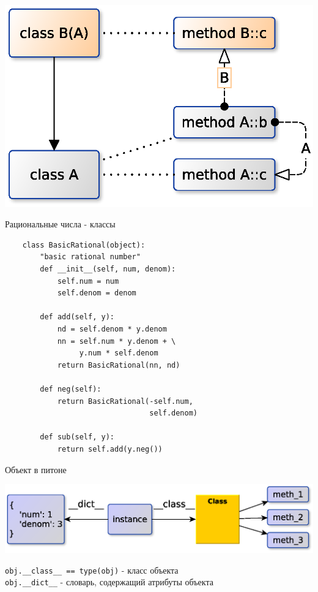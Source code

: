 \documentclass{article}
\begin{document}
\begin{center} \includegraphics{images/virt_hierarchi.eps} \end{center} 
\newpage

\begin{center} Рациональные числа - классы \end{center}
\begin{lstlisting}
    class BasicRational(object):
        "basic rational number"
        def __init__(self, num, denom):
            self.num = num
            self.denom = denom

        def add(self, y):
            nd = self.denom * y.denom
            nn = self.num * y.denom + \
                 y.num * self.denom
            return BasicRational(nn, nd)

        def neg(self):
            return BasicRational(-self.num,
                                 self.denom)

        def sub(self, y):
            return self.add(y.neg())
\end{lstlisting}
\newpage

\begin{center} Объект в питоне \end{center} 
\begin{center} \includegraphics[scale=0.8]{images/python_instance.eps} \end{center} 
\lstinline!obj.__class__ == type(obj)! - класс объекта \\
\lstinline!obj.__dict__! - словарь, содержащий атрибуты объекта
\newpage
\end{document}
